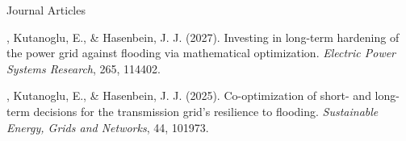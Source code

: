 \begin{rSection}{Journal Articles}
\begin{pubs}
    \item \me, Kutanoglu, E., \& Hasenbein, J. J. (2027). Investing in long-term hardening of the power grid against flooding via mathematical optimization. \textit{Electric Power Systems Research}, 265, 114402. 

    \item \me, Kutanoglu, E., \& Hasenbein, J. J. (2025). Co-optimization of short- and long-term decisions for the transmission grid's resilience to flooding. \textit{Sustainable Energy, Grids and Networks}, 44, 101973. 
\end{pubs}
\end{rSection}
